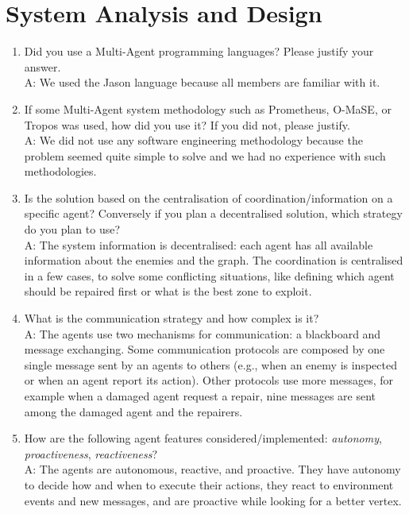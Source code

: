\section{System Analysis and Design}

\begin{enumerate}
 	\item  Did you use a Multi-Agent programming languages? Please justify your answer.\\
	A: We used the Jason language because all members are familiar with it.%
 
 	\item  If some Multi-Agent system methodology such as Prometheus, O-MaSE, or Tropos was used, how did you use it? If you did not, please justify.\\
	A: We did not use any software engineering methodology because the problem seemed quite simple to solve and we had no experience with such methodologies.%
   	   
 	\item  Is the solution based on the centralisation of coordination/information on a specific agent? Conversely if you plan a decentralised solution, which strategy do you plan to use?\\
	A: The system information is decentralised: each agent has all available information about the enemies and the graph. The coordination is centralised in a few cases, to solve some conflicting situations, like defining which agent should be repaired first or what is the best zone to exploit. %
   
	\item  What is the communication strategy and how complex is it?\\
	A: The agents use two mechanisms for communication: a blackboard and message exchanging. Some communication protocols are composed by one single message sent by an agents to others (e.g., when an enemy is inspected or when an agent report its action). Other protocols use more messages, for example when a damaged agent request a repair, nine messages are sent among the damaged agent and the repairers.%
		  
    \item  How are the following agent features considered/implemented: \emph{autonomy}, \emph{proactiveness}, \emph{reactiveness}?\\
	A: The agents are autonomous, reactive, and proactive. They have autonomy to decide how and when to execute their actions, they react to environment events and new messages, and are proactive while looking for a better vertex.%



\end{enumerate}
